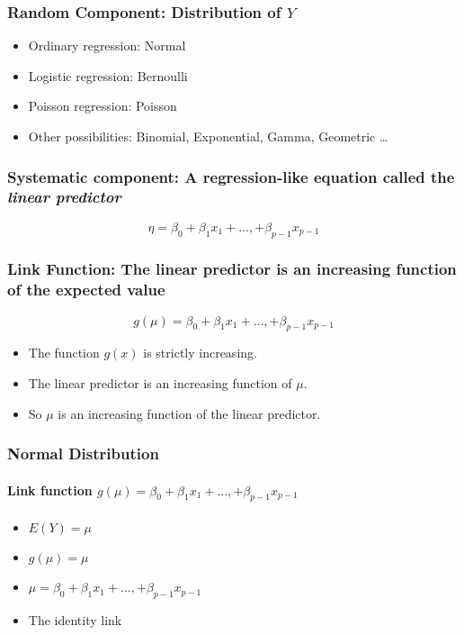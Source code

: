 \documentclass[serif]{beamer} %
\begin{document}
\begin{frame}
\frametitle{Random Component: Distribution of $Y$}
  \begin{itemize}
    \item Ordinary regression: Normal
    \item Logistic regression: Bernoulli
    \item Poisson regression: Poisson

\vspace{20mm}

    \item Other possibilities: Binomial, Exponential, Gamma, Geometric  \ldots

  \end{itemize}
\end{frame}

\begin{frame}
\frametitle{Systematic component: A regression-like equation called the \emph{linear predictor}}
{\LARGE
\begin{displaymath}
    \eta = \beta_0 + \beta_1 x_1 + \ldots, + \beta_{p-1}x_{p-1} 
\end{displaymath}
} %
\end{frame}

\begin{frame}
\frametitle{Link Function: The linear predictor is an increasing function of the expected value}
{\LARGE
\begin{displaymath}
    g(\mu) = \beta_0 + \beta_1 x_1 + \ldots, + \beta_{p-1}x_{p-1} 
\end{displaymath} }

  \begin{itemize}
    \item The function $g(x)$ is strictly increasing.
    \item The linear predictor is an increasing function of $\mu$.
    \item So $\mu$ is an increasing function of the linear predictor.
  \end{itemize}


\end{frame}

\begin{frame}
\frametitle{Normal Distribution}
\framesubtitle{Link function $g(\mu) = \beta_0 + \beta_1 x_1 + \ldots, + \beta_{p-1}x_{p-1}$} 
  \begin{itemize}
    \item $E(Y)=\mu$
    \item $g(\mu) = \mu$
    \item $\mu = \beta_0 + \beta_1 x_1 + \ldots, + \beta_{p-1}x_{p-1}$
    \item The identity link
  \end{itemize}
\end{frame}
\end{document}
